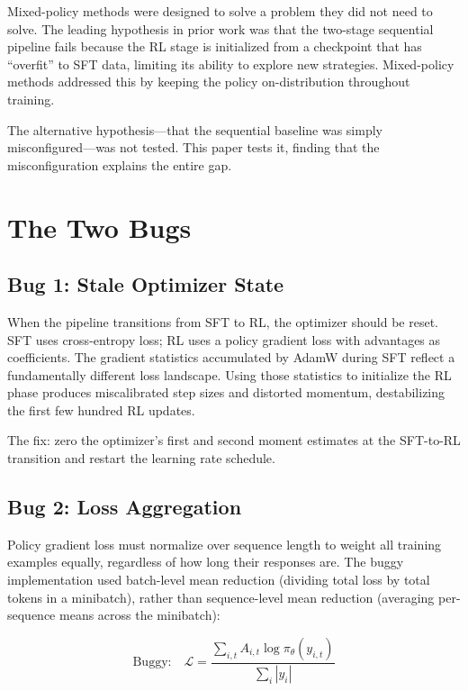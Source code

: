 \documentclass[10pt,twocolumn]{article}
\begin{document}
Mixed-policy methods were designed to solve a problem they did not need to solve.
The leading hypothesis in prior work was that the two-stage sequential pipeline fails because the RL stage is initialized from a checkpoint that has ``overfit'' to SFT data, limiting its ability to explore new strategies.
Mixed-policy methods addressed this by keeping the policy on-distribution throughout training.

The alternative hypothesis---that the sequential baseline was simply misconfigured---was not tested.
This paper tests it, finding that the misconfiguration explains the entire gap.

\section{The Two Bugs}

\subsection*{Bug 1: Stale Optimizer State}

When the pipeline transitions from SFT to RL, the optimizer should be reset.
SFT uses cross-entropy loss; RL uses a policy gradient loss with advantages as coefficients.
The gradient statistics accumulated by AdamW during SFT reflect a fundamentally different loss landscape.
Using those statistics to initialize the RL phase produces miscalibrated step sizes and distorted momentum, destabilizing the first few hundred RL updates.

The fix: zero the optimizer's first and second moment estimates at the SFT-to-RL transition and restart the learning rate schedule.

\subsection*{Bug 2: Loss Aggregation}

Policy gradient loss must normalize over sequence length to weight all training examples equally, regardless of how long their responses are.
The buggy implementation used batch-level mean reduction (dividing total loss by total tokens in a minibatch), rather than sequence-level mean reduction (averaging per-sequence means across the minibatch):

\begin{equation}
\text{Buggy:}\quad \mathcal{L} = \frac{\sum_{i,t} A_{i,t} \log \pi_\theta(y_{i,t})}{\sum_i |y_i|}
\end{equation}
\end{document}

